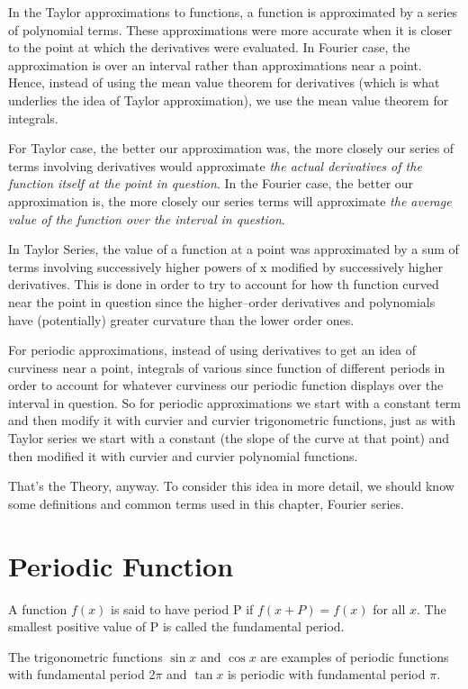 \documentclass[a4paper,12pt,twoside]{report}
\begin{document}
In the Taylor approximations to functions, a function is approximated by a series of polynomial terms.  These approximations were more accurate when it is closer to the point at which the derivatives were evaluated.  In Fourier case, the approximation is over an interval rather than approximations near a point.  Hence, instead of using the mean value theorem for derivatives (which is what underlies the idea of Taylor approximation), we use the mean value theorem for integrals.

For Taylor case, the better our approximation was, the more closely our series of terms involving derivatives would approximate \textit{the actual derivatives of the function itself at the point in question}.  In the Fourier case, the better our approximation is, the more closely our series terms will approximate \textit{the average value of the function over the interval in question}.  

In Taylor Series, the value of a function at a point was approximated by a sum of terms involving successively higher powers of x modified by successively higher derivatives. This is done in order to try to account for how th function curved near the point in question since the higher--order derivatives and polynomials have (potentially) greater curvature than the lower order ones.

For periodic approximations, instead of using derivatives to get an idea of curviness near a point, integrals of various since function of different periods in order to account for whatever curviness our periodic function displays over the interval in question.  So for periodic approximations we start with a constant term and then modify it with curvier and curvier trigonometric functions, just as with Taylor series we start with a constant (the slope of the curve at that point) and then modified it with curvier and curvier polynomial functions. 

That's the Theory, anyway.  To consider this idea in more detail, we should know some definitions and common terms used in this chapter, Fourier series.


\section{Periodic Function}
A function $f(x)$ is said to have period P if $f(x+P)= f(x)$ for all $x$.  The smallest positive value of P is called the fundamental period.  

The trigonometric functions $\sin x$ and $\cos x$ are examples of periodic functions with fundamental period 2$\pi$ and $\tan x$ is periodic with fundamental period $\pi$. 
\end{document}
